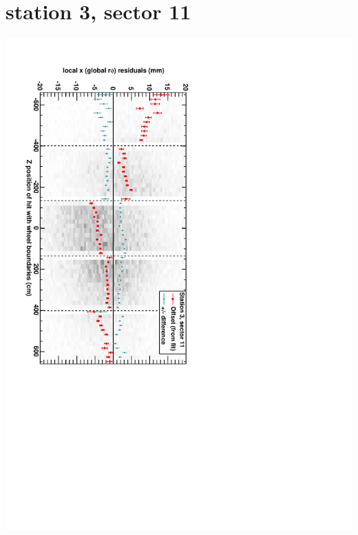 \documentclass[compress]{beamer}
\begin{document}
\section*{station 3, sector 11}
\begin{frame} \vfill \mbox{\hspace{-1 cm}\includegraphics[height=1.2\linewidth, angle=90]{DTrphiVsZ_st3_sr11.pdf}} \end{frame}
\end{document}
